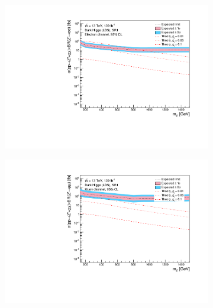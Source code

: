\documentclass[12pt, a4paper]{book}
\begin{document}
\begin{figure}[!ht]
	\centering
	\begin{subfigure}[b]{0.49\textwidth}
      \centering
      \includegraphics[width=1\textwidth]{Limits/Model_independent/50-100/DH_LDS/mass_exclusion_ee.pdf}
   \end{subfigure}
   \hfill
   \begin{subfigure}[b]{0.49\textwidth}
      \centering
      \includegraphics[width=1\textwidth]{Limits/Model_independent/50-100/DH_LDS/mass_exclusion_uu.pdf}
   \end{subfigure}
   \hfill
   \begin{subfigure}[b]{0.49\textwidth}
      \centering

\end{subfigure}
\end{figure}
\end{document}
